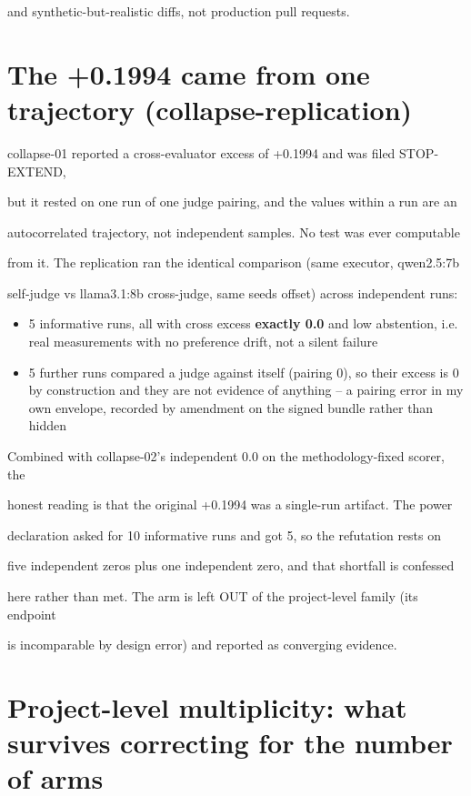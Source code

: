 \documentclass[11pt]{article}
\begin{document}
and synthetic-but-realistic diffs, not production pull requests.


\section*{The +0.1994 came from one trajectory (collapse-replication)}

collapse-01 reported a cross-evaluator excess of +0.1994 and was filed STOP-EXTEND,

but it rested on one run of one judge pairing, and the values within a run are an

autocorrelated trajectory, not independent samples. No test was ever computable

from it. The replication ran the identical comparison (same executor, qwen2.5:7b

self-judge vs llama3.1:8b cross-judge, same seeds offset) across independent runs:


\begin{itemize}
\item 5 informative runs, all with cross excess {\bf exactly 0.0} and low abstention, i.e. real measurements with no preference drift, not a silent failure
\item 5 further runs compared a judge against itself (pairing 0), so their excess is 0 by construction and they are not evidence of anything -- a pairing error in my own envelope, recorded by amendment on the signed bundle rather than hidden
\end{itemize}

Combined with collapse-02's independent 0.0 on the methodology-fixed scorer, the

honest reading is that the original +0.1994 was a single-run artifact. The power

declaration asked for 10 informative runs and got 5, so the refutation rests on

five independent zeros plus one independent zero, and that shortfall is confessed

here rather than met. The arm is left OUT of the project-level family (its endpoint

is incomparable by design error) and reported as converging evidence.


\section*{Project-level multiplicity: what survives correcting for the number of arms}
\end{document}

